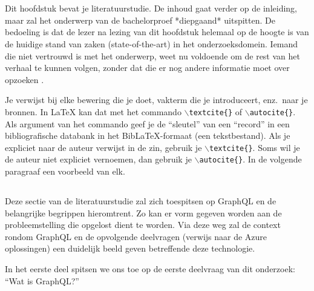 \chapter{}%
\label{ch:stand-van-zaken}



Dit hoofdstuk bevat je literatuurstudie. De inhoud gaat verder op de inleiding, maar zal het onderwerp van de bachelorproef *diepgaand* uitspitten. De bedoeling is dat de lezer na lezing van dit hoofdstuk helemaal op de hoogte is van de huidige stand van zaken (state-of-the-art) in het onderzoeksdomein. Iemand die niet vertrouwd is met het onderwerp, weet nu voldoende om de rest van het verhaal te kunnen volgen, zonder dat die er nog andere informatie moet over opzoeken \autocite{Pollefliet2011}.

Je verwijst bij elke bewering die je doet, vakterm die je introduceert, enz.\ naar je bronnen. In \LaTeX{} kan dat met het commando \texttt{$\backslash${textcite\{\}}} of \texttt{$\backslash${autocite\{\}}}. Als argument van het commando geef je de ``sleutel'' van een ``record'' in een bibliografische databank in het Bib\LaTeX{}-formaat (een tekstbestand). Als je expliciet naar de auteur verwijst in de zin, gebruik je \texttt{$\backslash${}textcite\{\}}.
Soms wil je de auteur niet expliciet vernoemen, dan gebruik je \texttt{$\backslash${}autocite\{\}}. In de volgende paragraaf een voorbeeld van elk.

\section{}%
\label{sec:GraphQL}
Deze sectie van de literatuurstudie zal zich toespitsen op GraphQL en de belangrijke begrippen hieromtrent. Zo kan er vorm gegeven worden aan de probleemstelling die opgelost dient te worden. Via deze weg zal de context rondom GraphQL en de opvolgende deelvragen (verwijs naar de Azure oplossingen) een duidelijk beeld geven betreffende deze technologie.

In het eerste deel spitsen we ons toe op de eerste deelvraag van dit onderzoek: “Wat is GraphQL?”

